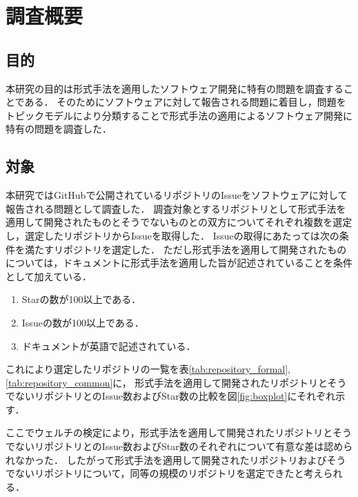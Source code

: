 \documentclass[main]{subfiles}
\begin{document}
\chapter{調査概要}

\section{目的}

本研究の目的は形式手法を適用したソフトウェア開発に特有の問題を調査することである．
そのためにソフトウェアに対して報告される問題に着目し，問題をトピックモデルにより分類することで形式手法の適用によるソフトウェア開発に特有の問題を調査した．


\section{対象}
\label{sec:survey-target}

本研究ではGitHubで公開されているリポジトリのIssueをソフトウェアに対して報告される問題として調査した．
調査対象とするリポジトリとして形式手法を適用して開発されたものとそうでないものとの双方についてそれぞれ複数を選定し，選定したリポジトリからIssueを取得した．
Issueの取得にあたっては次の条件を満たすリポジトリを選定した．
ただし形式手法を適用して開発されたものについては，ドキュメントに形式手法を適用した旨が記述されていることを条件として加えている．

\begin{enumerate}
	\item Starの数が100以上である．
	\item Issueの数が100以上である．
	\item ドキュメントが英語で記述されている．
\end{enumerate}

これにより選定したリポジトリの一覧を表\ref{tab:repository_formal}, \ref{tab:repository_common}に，
形式手法を適用して開発されたリポジトリとそうでないリポジトリとのIssue数およびStar数の比較を図\ref{fig:boxplot}にそれぞれ示す．

ここでウェルチの検定により，形式手法を適用して開発されたリポジトリとそうでないリポジトリとのIssue数およびStar数のそれぞれについて有意な差は認められなかった．
したがって形式手法を適用して開発されたリポジトリおよびそうでないリポジトリについて，同等の規模のリポジトリを選定できたと考えられる．


\end{document}
